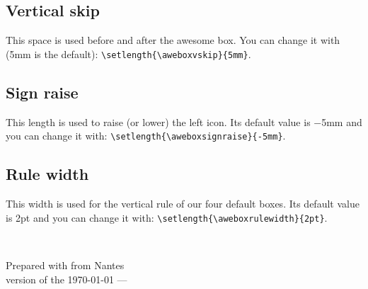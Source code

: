 \documentclass[a4paper,12pt]{article}
\def\abIconHeart{\symbol{"F004}}
\newcommand{\colophon}{
  ~\vfill
  \begin{center}
    \scriptsize Prepared with {\ABFamily\abIconHeart} from Nantes\\
    \tiny version of the \today{} --- \currenttime
  \end{center}
}
\begin{document}
\subsection{Vertical skip}

This space is used before and after the awesome box. You can change it
with (5mm is the default): \verb!\setlength{\aweboxvskip}{5mm}!.

\subsection{Sign raise}

This length is used to raise (or lower) the left icon. Its default value
is −5mm and you can change it with:
\verb!\setlength{\aweboxsignraise}{-5mm}!.

\subsection{Rule width}

This width is used for the vertical rule of our four default boxes. Its
default value is 2pt and you can change it with:
\verb!\setlength{\aweboxrulewidth}{2pt}!.


\colophon
\end{document}
